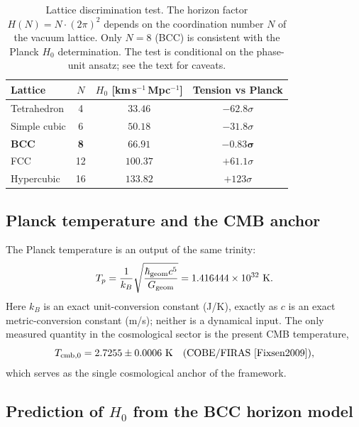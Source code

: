 \documentclass[10pt,a4paper]{article}
\begin{document}
\begin{table}[h]
	\centering
	\small
	\caption{Lattice discrimination test. The horizon factor
		\(H(N) = N \cdot (2\pi)^2\) depends on the coordination number
		\(N\) of the vacuum lattice. Only \(N=8\) (BCC) is consistent
		with the Planck \(H_0\) determination. The test is
		conditional on the phase-unit ansatz; see the text for
		caveats.}
	\label{tab:cosmo_lattice_test}
	\begin{tabular}{lccc}
		\toprule
		\textbf{Lattice} & \(N\) & \(H_0\) [km\,s\(^{-1}\)\,Mpc\(^{-1}\)] & \textbf{Tension vs Planck} \\
		\midrule
		Tetrahedron   & 4  & \(33.46\)  & \(-62.8\sigma\) \\
		Simple cubic  & 6  & \(50.18\)  & \(-31.8\sigma\) \\
		\textbf{BCC}  & \textbf{8}  & \(\mathbf{66.91}\) & \(\mathbf{-0.83\sigma}\) \\
		FCC           & 12 & \(100.37\) & \(+61.1\sigma\) \\
		Hypercubic    & 16 & \(133.82\) & \(+123\sigma\) \\
		\bottomrule
	\end{tabular}
\end{table}

\subsection{Planck temperature and the CMB anchor}

The Planck temperature is an output of the same trinity:
\begin{equation}
	T_p = \frac{1}{k_B}\sqrt{\frac{\hbar_{\rm geom} c^5}{G_{\rm geom}}}
	= 1.416444\times 10^{32}\ {\rm K}.
	\label{eq:summary_Tp}
\end{equation}
Here \(k_B\) is an exact unit-conversion constant (J/K), exactly as
\(c\) is an exact metric-conversion constant (m/s); neither is a
dynamical input. The only measured quantity in the cosmological
sector is the present CMB temperature,
\begin{equation}
	T_{\rm cmb,0} = 2.7255 \pm 0.0006\ {\rm K}
	\quad(\text{COBE/FIRAS~\cite{Fixsen2009}}),
	\label{eq:summary_Tcmb}
\end{equation}
which serves as the single cosmological anchor of the framework.

\subsection{Prediction of \texorpdfstring{\(H_0\)}{H0} from the BCC horizon model}
\label{sec:cosmo_H0_derivation}
\end{document}
